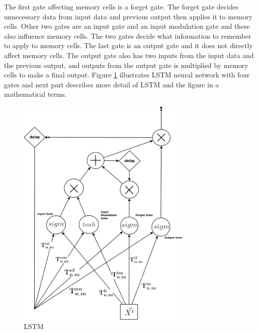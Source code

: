 \documentclass[draft,dvipsnames]{drexel-thesis}
\begin{document}
\begin{thesis}
\begin{enumerate}
	The first gate affecting memory cells is a forget gate. The forget gate decides unnecessary data from input data and previous output then applies it to memory cells. Other two gates are an input gate and an input modulation gate and these also influence memory cells. The two gates decide what information to remember to apply to memory cells. The last gate is an output gate and it does not directly affect memory cells. The output gate also has two inputs from the input data and the previous output, and outputs from the output gate is multiplied by memory cells to make a final output. Figure \ref{fig:LSTM} illustrates LSTM neural network with four gates and next part describes more detail of LSTM and the figure in a mathematical terms.

\begin{figure}[t!]
    \centering
    \includegraphics[width=0.75\textwidth]{pictures/figures/LSTM.png}
    \caption{LSTM}
    \label{fig:LSTM}
\end{figure}



\end{enumerate}
\end{thesis}
\end{document}
